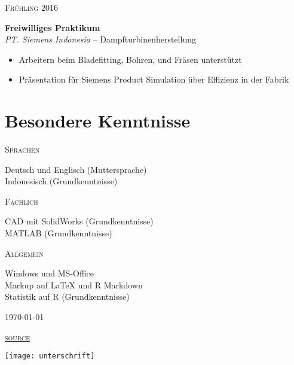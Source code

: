 \documentclass[a4paper]{article}
\newcommand{\entry}[4]{

	\begin{minipage}[t]{.20\textwidth}
		\hfill \textsc{#1}

	\end{minipage}
	\hfill\vline\hfill
	\begin{minipage}[t]{.75\textwidth}
		\textbf{#2} \\ 
		\textit{#3}    
		#4

	\end{minipage} 
	\vspace{.25cm}

}
\newcommand{\nentry}[2]{

	\begin{minipage}[t]{.20\textwidth}
		\hfill \textsc{#1}

	\end{minipage}
	\hfill\vline\hfill
	\begin{minipage}[t]{.75\textwidth}
		#2 

	\end{minipage}
	\vspace{.25cm} 

}
\begin{document}
\entry{Fr{\"u}hling 2016}{Freiwilliges Praktikum}{PT. Siemens Indonesia}{-- Dampfturbinenherstellung\vspace{-.25cm} 
	\begin{itemize}[leftmargin=*]
		\setlength{\itemsep}{-3pt}
	\item Arbeitern beim Bladefitting, Bohren, und Fr{\"a}sen unterst{\"u}tzt 
			\item Pr{\"a}sentation f{\"u}r Siemens Product Simulation {\"u}ber Effizienz in der Fabrik
	\end{itemize}	
}

\section{Besondere Kenntnisse}

\nentry{Sprachen}{Deutsch und Englisch (Muttersprache)\\ Indonesisch (Grundkenntnisse)}

\nentry{Fachlich}{CAD mit SolidWorks (Grundkenntnisse) \\ MATLAB (Grundkenntnisse)}

\nentry{Allgemein}{Windows und MS-Office\\Markup auf {\LaTeX} und R Markdown\\Statistik auf R (Grundkenntnisse)}

\vspace*{\fill} 
\begin{minipage}{0.4\textwidth}
	\today
\end{minipage}
\begin{minipage}{0.19\textwidth}
	\flushright
	\href{https://github.com/emfiedler/cv}{\textsc{source}}
\end{minipage}
\begin{minipage}{0.4\textwidth}
	\flushright
	\texttt{[image: unterschrift]}
\end{minipage}
\end{document}
